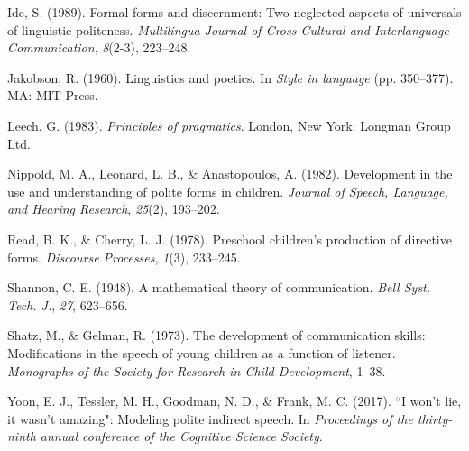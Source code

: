 \documentclass[10pt, letterpaper]{article}
\begin{document}
\hypertarget{ref-ide1989}{}
Ide, S. (1989). Formal forms and discernment: Two neglected aspects of
universals of linguistic politeness. \emph{Multilingua-Journal of
Cross-Cultural and Interlanguage Communication}, \emph{8}(2-3),
223--248.

\hypertarget{ref-jakobson1960}{}
Jakobson, R. (1960). Linguistics and poetics. In \emph{Style in
language} (pp. 350--377). MA: MIT Press.

\hypertarget{ref-leech1983}{}
Leech, G. (1983). \emph{Principles of pragmatics}. London, New York:
Longman Group Ltd.

\hypertarget{ref-nippold1982}{}
Nippold, M. A., Leonard, L. B., \& Anastopoulos, A. (1982). Development
in the use and understanding of polite forms in children. \emph{Journal
of Speech, Language, and Hearing Research}, \emph{25}(2), 193--202.

\hypertarget{ref-read1978}{}
Read, B. K., \& Cherry, L. J. (1978). Preschool children's production of
directive forms. \emph{Discourse Processes}, \emph{1}(3), 233--245.

\hypertarget{ref-shannon1948}{}
Shannon, C. E. (1948). A mathematical theory of communication.
\emph{Bell Syst. Tech. J.}, \emph{27}, 623--656.

\hypertarget{ref-shatz1973}{}
Shatz, M., \& Gelman, R. (1973). The development of communication
skills: Modifications in the speech of young children as a function of
listener. \emph{Monographs of the Society for Research in Child
Development}, 1--38.

\hypertarget{ref-yoon2017}{}
Yoon, E. J., Tessler, M. H., Goodman, N. D., \& Frank, M. C. (2017). ``I
won't lie, it wasn't amazing": Modeling polite indirect speech. In
\emph{Proceedings of the thirty-ninth annual conference of the Cognitive
Science Society}.


\end{document}
